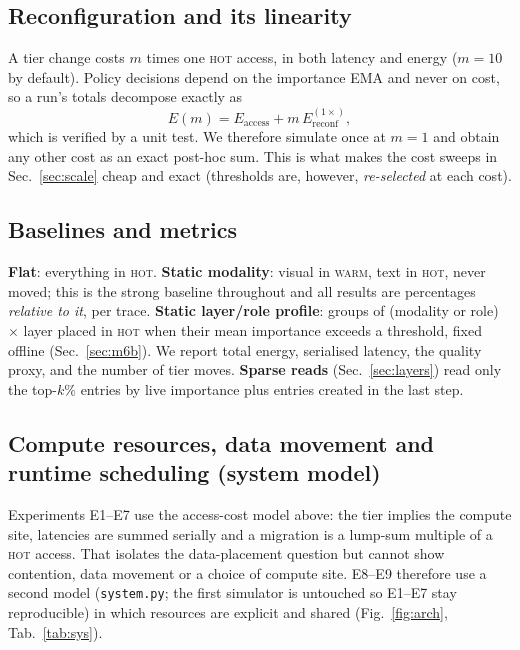 \documentclass[10pt,a4paper]{article}
\newcommand{\hot}{\textsc{hot}}
\newcommand{\warm}{\textsc{warm}}
\begin{document}
\subsection{Reconfiguration and its linearity}
A tier change costs $m$ times one \hot{} access, in both latency and energy ($m{=}10$ by default). Policy decisions depend on the importance EMA and never on cost, so a run's totals decompose exactly as
\begin{equation}
E(m)=E_{\text{access}}+m\,E_{\text{reconf}}^{(1\times)},
\end{equation}
which is verified by a unit test. We therefore simulate once at $m{=}1$ and obtain any other cost as an exact post-hoc sum. This is what makes the cost sweeps in Sec.~\ref{sec:scale} cheap and exact (thresholds are, however, \emph{re-selected} at each cost).

\subsection{Baselines and metrics}
\textbf{Flat}: everything in \hot{}. \textbf{Static modality}: visual in \warm{}, text in \hot{}, never moved; this is the strong baseline throughout and all results are percentages \emph{relative to it}, per trace. \textbf{Static layer/role profile}: groups of (modality or role) $\times$ layer placed in \hot{} when their mean importance exceeds a threshold, fixed offline (Sec.~\ref{sec:m6b}). We report total energy, serialised latency, the quality proxy, and the number of tier moves. \textbf{Sparse reads} (Sec.~\ref{sec:layers}) read only the top-$k\%$ entries by live importance plus entries created in the last step.

\subsection{Compute resources, data movement and runtime scheduling (system model)}
\label{sec:sys}
Experiments E1--E7 use the access-cost model above: the tier implies the compute site, latencies are summed serially and a migration is a lump-sum multiple of a \hot{} access. That isolates the data-placement question but cannot show contention, data movement or a choice of compute site. E8--E9 therefore use a second model (\texttt{system.py}; the first simulator is untouched so E1--E7 stay reproducible) in which resources are explicit and shared (Fig.~\ref{fig:arch}, Tab.~\ref{tab:sys}).
\end{document}
